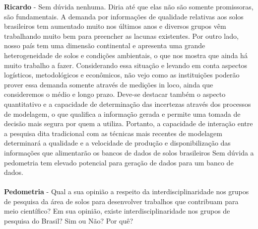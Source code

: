 \textbf{Ricardo} - Sem dúvida nenhuma. Diria até que elas não são somente promissoras, são fundamentais. A demanda por informações de qualidade relativas aos solos brasileiros tem aumentado muito nos últimos anos e diversos grupos vêm trabalhando muito bem para preencher as lacunas existentes. Por outro lado, nosso país tem uma dimensão continental e apresenta uma grande heterogeneidade de solos e condições ambientais, o que nos mostra que ainda há muito trabalho a fazer. Considerando essa situação e levando em conta aspectos logísticos, metodológicos e econômicos, não vejo como as instituições poderão prover essa demanda somente através de medições in loco, ainda que consideremos o médio e longo prazo. Deve-se destacar também o aspecto quantitativo e a capacidade de determinação das incertezas através dos processos de modelagem, o que qualifica a informação gerada e permite uma tomada de decisão mais segura por quem a utiliza. Portanto, a capacidade de interação entre a pesquisa dita tradicional com as técnicas mais recentes de modelagem determinará a qualidade e a velocidade de produção e disponibilização das informações que alimentarão os bancos de dados de solos brasileiros
Sem dúvida a pedometria tem elevado potencial para geração de dados para um banco de dados.\\
\\
\textbf{Pedometria} - Qual a sua opinião a respeito da interdisciplinaridade nos grupos de pesquisa da área de solos para desenvolver trabalhos que contribuam para meio científico? Em sua opinião, existe interdisciplinaridade nos grupos de pesquisa do Brasil? Sim ou Não? Por quê?\\
\\
